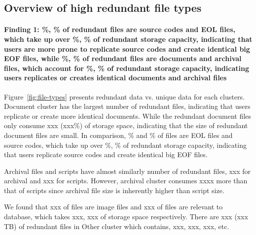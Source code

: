 \subsection{Overview of high redundant file types}

\paragraph{Finding 1: \%, \% of redundant files are source codes and EOL files, which take up over \%, \% of redundant storage capacity, indicating that users are more prone to replicate source codes and create identical big EOF files, while \%, \% of redundant files are documents and archival files, which account for \%, \% of redundant storage capacity, indicating users replicates or creates identical documents and archival files}

Figure~\ref{fig:file-types} presents redundant data vs. unique data for each clusters. 
Document cluster has the largest number of redundant files, indicating that users replicate or create more identical documents. While the redundant document files only consume xxx (xxx\%) of storage space, indicating that the size of redundant document files are small. In comparison, \% and \% of files are EOL files and source codes, which take up over \%, \% of redundant storage capacity, indicating that users replicate source codes and create identical big EOF files.

Archival files and scripts have almost similarly number of redundant files, xxx for archival and xxx for scripts. However, archival cluster consumes xxxx more than that of scripts since archival file size is inherently higher than script size.

We found that xxx of files are image files and xxx of files are relevant to database, which takes xxx, xxx of storage space respectively. There are xxx (xxx TB) of redundant files in Other cluster which contains, xxx, xxx, xxx, etc. 

